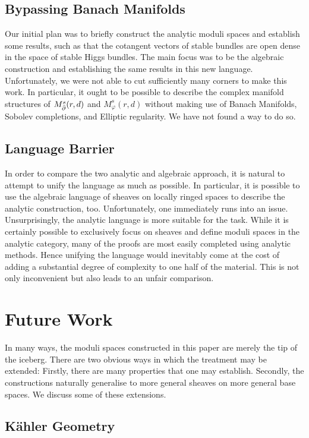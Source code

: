 \documentclass[12pt]{ociamthesis}  %
\begin{document}
\subsection{Bypassing Banach Manifolds}

Our initial plan was to briefly construct the analytic moduli spaces
and establish some results, such as that the cotangent vectors of
stable bundles are open dense in the space of stable Higgs bundles.
The main focus was to be the algebraic construction and establishing the
same results in this new language. Unfortunately, we were not able to
cut sufficiently many corners to make this work. In particular,
it ought to be possible to describe the complex
manifold structures of $M^s_{\bar{\partial}}(r,d)$ and $M^s_\varphi(r,d)$
without making use of Banach Manifolds, Sobolev completions, and
Elliptic regularity. We have not found a way to do so.

\subsection{Language Barrier}

In order to compare the two analytic and algebraic approach,
it is natural to attempt to unify the language as much as possible.
In particular, it is possible to use the algebraic language of
sheaves on locally ringed spaces to describe the analytic
construction, too. Unfortunately, one immediately runs into
an issue. Unsurprisingly, the analytic language is more suitable for the
task. While it is certainly possible to exclusively focus on
sheaves and define moduli spaces in the analytic category, many
of the proofs are most easily completed using analytic methods.
Hence unifying the language would inevitably come at the cost
of adding a substantial degree of complexity to one half of the
material. This is not only inconvenient but also leads to an
unfair comparison.

\section{Future Work}

In many ways, the moduli spaces constructed in this paper are
merely the tip of the iceberg. There are two obvious ways in which
the treatment may be extended: Firstly, there are many properties
that one may establish. Secondly, the constructions naturally generalise
to more general sheaves on more general base spaces. We discuss
some of these extensions.

\subsection{K\"ahler Geometry}
\end{document}
